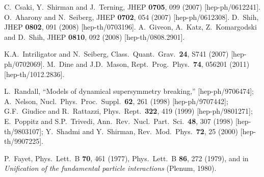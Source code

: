 \documentclass[12pt]{article}
\begin{document}
\begin{thebibliography}{999}
%
  C.~Csaki, Y.~Shirman and J.~Terning,
  JHEP {\bf 0705}, 099 (2007)
  [hep-ph/0612241].
%
  O.~Aharony and N.~Seiberg,
  JHEP {\bf 0702}, 054 (2007)
  [hep-ph/0612308].
%
  D.~Shih,
  JHEP {\bf 0802}, 091 (2008)
  [hep-th/0703196].
%
  A.~Giveon, A.~Katz, Z.~Komargodski and D.~Shih, 
  JHEP {\bf 0810}, 092 (2008)   
  [hep-th/0808.2901].

K.A.~Intriligator and N.~Seiberg,
  Class.\ Quant.\ Grav.\  {\bf 24}, S741 (2007)
  [hep-ph/0702069].
M.~Dine and J.D.~Mason,
  Rept.\ Prog.\ Phys.\  {\bf 74}, 056201 (2011)
  [hep-th/1012.2836].

L.~Randall, 
  ``Models of dynamical supersymmetry breaking,''
  [hep-ph/9706474];
A.~Nelson, 
  Nucl.\ Phys.\ Proc.\ Suppl.\  {\bf 62}, 261 (1998)
  [hep-ph/9707442];
G.F.~Giudice and R.~Rattazzi,
  Phys.\ Rept.\  {\bf 322}, 419 (1999)
  [hep-ph/9801271];
E.~Poppitz and S.P.~Trivedi,
  Ann.\ Rev.\ Nucl.\ Part.\ Sci.\  {\bf 48}, 307 (1998)
  [hep-th/9803107];
Y.~Shadmi and Y.~Shirman,
  Rev.\ Mod.\ Phys.\  {\bf 72}, 25 (2000)
  [hep-th/9907225].

P.~Fayet, 
  Phys.\ Lett.\ B {\bf 70}, 461 (1977),
  Phys.\ Lett.\ B {\bf 86}, 272 (1979),
  and in {\em Unification of the fundamental
  particle interactions} (Plenum, 1980).


\end{thebibliography}
\end{document}
